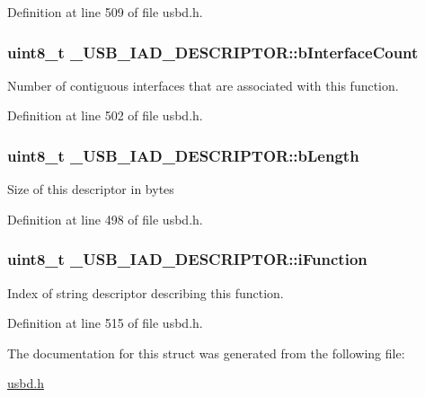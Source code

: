 Definition at line 509 of file usbd.\+h.

\subsubsection[{\texorpdfstring{b\+Interface\+Count}{bInterfaceCount}}]{\setlength{\rightskip}{0pt plus 5cm}uint8\+\_\+t \+\_\+\+U\+S\+B\+\_\+\+I\+A\+D\+\_\+\+D\+E\+S\+C\+R\+I\+P\+T\+O\+R\+::b\+Interface\+Count}\hypertarget{struct__USB__IAD__DESCRIPTOR_adbaa947d670f827e1c063614daa792fe}{}\label{struct__USB__IAD__DESCRIPTOR_adbaa947d670f827e1c063614daa792fe}
Number of contiguous interfaces that are associated with this function. 

Definition at line 502 of file usbd.\+h.

\subsubsection[{\texorpdfstring{b\+Length}{bLength}}]{\setlength{\rightskip}{0pt plus 5cm}uint8\+\_\+t \+\_\+\+U\+S\+B\+\_\+\+I\+A\+D\+\_\+\+D\+E\+S\+C\+R\+I\+P\+T\+O\+R\+::b\+Length}\hypertarget{struct__USB__IAD__DESCRIPTOR_a479007e955942af951b4f600a93f7453}{}\label{struct__USB__IAD__DESCRIPTOR_a479007e955942af951b4f600a93f7453}
Size of this descriptor in bytes 

Definition at line 498 of file usbd.\+h.

\subsubsection[{\texorpdfstring{i\+Function}{iFunction}}]{\setlength{\rightskip}{0pt plus 5cm}uint8\+\_\+t \+\_\+\+U\+S\+B\+\_\+\+I\+A\+D\+\_\+\+D\+E\+S\+C\+R\+I\+P\+T\+O\+R\+::i\+Function}\hypertarget{struct__USB__IAD__DESCRIPTOR_a486ad14fb6b12d498212061b9610ce02}{}\label{struct__USB__IAD__DESCRIPTOR_a486ad14fb6b12d498212061b9610ce02}
Index of string descriptor describing this function. 

Definition at line 515 of file usbd.\+h.



The documentation for this struct was generated from the following file\+:\begin{DoxyCompactItemize}
\item 
\hyperlink{usbd_8h}{usbd.\+h}\end{DoxyCompactItemize}
